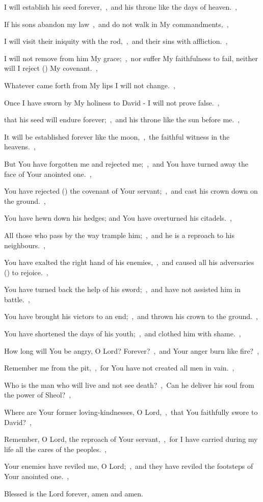 \documentclass[12pt,twoside,a5paper]{article}
\begin{document}
\begin{normalparskip}
  I will establish his seed forever,~\sep\ and his throne like the days of heaven.~\sep

  If his sons abandon my law~\sep\ and do not walk in My commandments,~\sep

  I will visit their iniquity with the rod,~\sep\ and their sins with affliction.~\sep

  I will not remove from him My grace;~\sep\ nor suffer My faithfulness to fail, neither will I reject () My covenant.~\sep

  Whatever came forth from My lips I will not change.~\sep

  Once I have sworn by My holiness to David - I will not prove false.~\sep

  that his seed will endure forever;~\sep\ and his throne like the sun before me.~\sep

  It will be established forever like the moon,~\sep\ the faithful witness in the heavens.~\sep

  But You have forgotten me and rejected me;~\sep\ and You have turned away the face of Your anointed one.~\sep

  You have rejected () the covenant of Your servant;~\sep\ and cast his crown down on the ground.~\sep

  You have hewn down his hedges; and You have overturned his citadels.~\sep

  All those who pass by the way trample him;~\sep\ and he is a reproach to his neighbours.~\sep

  You have exalted the right hand of his enemies,~\sep\ and caused all his adversaries () to rejoice.~\sep

  You have turned back the help of his sword;~\sep\ and have not assisted him in battle.~\sep

  You have brought his victors to an end;~\sep\ and thrown his crown to the ground.~\sep

  You have shortened the days of his youth;~\sep\ and clothed him with shame.~\sep

  How long will You be angry, O Lord? Forever?~\sep\ and Your anger burn like fire?~\sep

  Remember me from the pit,~\sep\ for You have not created all men in vain.~\sep

  Who is the man who will live and not see death?~\sep\ Can he deliver his soul from the power of Sheol?~\sep

  Where are Your former loving-kindnesses, O Lord,~\sep\ that You faithfully swore to David?~\sep

  Remember, O Lord, the reproach of Your servant,~\sep\ for I have carried during my life all the cares of the peoples.~\sep

  Your enemies have reviled me, O Lord;~\sep\ and they have reviled the footsteps of Your anointed one.~\sep

  Blessed is the Lord forever, amen and amen.
\end{normalparskip}
\end{document}
